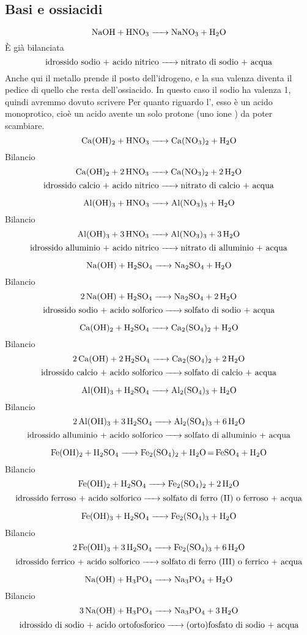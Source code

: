 \subsection{Basi e ossiacidi}

$$\ce{NaOH + HNO_3 -> NaNO_3 + H_2O}$$
È già bilanciata
$$\text{idrossido sodio + acido nitrico} \ce{->} \text{nitrato di sodio + acqua}$$
Anche qui il metallo prende il posto dell'idrogeno, e la sua valenza diventa il pedice di quello che resta dell'ossiacido. In questo caso il sodio ha valenza 1, quindi avremmo dovuto scrivere 
Per quanto riguardo l', esso è un acido monoprotico, cioè un acido avente un solo protone (uno ione ) da poter scambiare.
$$\ce{Ca(OH)_2 + HNO_3 -> Ca(NO_3)_2 + H_2O}$$Bilancio
$$\ce{Ca(OH)_2 + 2 HNO_3 -> Ca(NO_3)_2 + 2 H_2O}$$
$$\text{idrossido calcio + acido nitrico} \ce{->} \text{nitrato di calcio + acqua}$$

$$\ce{Al(OH)_3 + HNO_3 -> Al(NO_3)_3 + H_2O}$$Bilancio
\newpage
$$\ce{Al(OH)_3 + 3 HNO_3 -> Al(NO_3)_3 + 3 H_2O}$$
$$\text{idrossido alluminio + acido nitrico} \ce{->} \text{nitrato di alluminio + acqua}$$

$$\ce{Na(OH) + H_2SO_4 -> Na_2SO_4 + H_2O}$$Bilancio
$$\ce{2 Na(OH) + H_2SO_4 -> Na_2SO_4 + 2 H_2O}$$
$$\text{idrossido sodio + acido solforico} \ce{->} \text{solfato di sodio + acqua}$$

$$\ce{Ca(OH)_2 + H_2SO_4 -> Ca_2(SO_4)_2 + H_2O}$$Bilancio
$$\ce{2 Ca(OH) + 2H_2SO_4 -> Ca_2(SO_4)_2 +  2 H_2O}$$
$$\text{idrossido calcio + acido solforico} \ce{->} \text{solfato di calcio + acqua}$$

$$\ce{Al(OH)_3 + H_2SO_4 -> Al_2(SO_4)_3 + H_2O}$$Bilancio
$$\ce{2 Al(OH)_3 + 3H_2SO_4 -> Al_2(SO_4)_3 + 6 H_2O}$$
$$\text{idrossido alluminio + acido solforico} \ce{->} \text{solfato di alluminio + acqua}$$

$$\ce{Fe(OH)_2 + H_2SO_4 -> Fe_2(SO_4)_2 + H_2O \text{=} FeSO_4 + H_2O}$$Bilancio
$$\ce{Fe(OH)_2 + H_2SO_4 -> Fe_2(SO_4)_2 + 2 H_2O}$$
$$\text{idrossido ferroso + acido solforico} \ce{->} \text{solfato di ferro (II) o ferroso + acqua}$$

$$\ce{Fe(OH)_3 + H_2SO_4 -> Fe_2(SO_4)_3 + H_2O}$$Bilancio
$$\ce{2 Fe(OH)_3 + 3H_2SO_4 -> Fe_2(SO_4)_3 + 6 H_2O}$$
$$\text{idrossido ferrico + acido solforico} \ce{->} \text{solfato di ferro (III) o ferrico + acqua}$$

$$\ce{Na(OH) + H_3PO_4 -> Na_3PO_4 + H_2O}$$Bilancio
$$\ce{3 Na(OH) + H_3PO_4 -> Na_3PO_4 + 3 H_2O}$$
$$\text{idrossido di sodio + acido ortofosforico} \ce{->} \text{(orto)fosfato di sodio + acqua}$$

